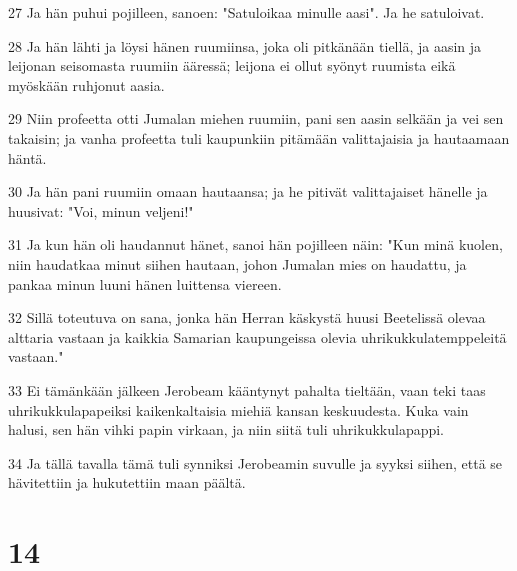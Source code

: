 \par 27 Ja hän puhui pojilleen, sanoen: "Satuloikaa minulle aasi". Ja he satuloivat.
\par 28 Ja hän lähti ja löysi hänen ruumiinsa, joka oli pitkänään tiellä, ja aasin ja leijonan seisomasta ruumiin ääressä; leijona ei ollut syönyt ruumista eikä myöskään ruhjonut aasia.
\par 29 Niin profeetta otti Jumalan miehen ruumiin, pani sen aasin selkään ja vei sen takaisin; ja vanha profeetta tuli kaupunkiin pitämään valittajaisia ja hautaamaan häntä.
\par 30 Ja hän pani ruumiin omaan hautaansa; ja he pitivät valittajaiset hänelle ja huusivat: "Voi, minun veljeni!"
\par 31 Ja kun hän oli haudannut hänet, sanoi hän pojilleen näin: "Kun minä kuolen, niin haudatkaa minut siihen hautaan, johon Jumalan mies on haudattu, ja pankaa minun luuni hänen luittensa viereen.
\par 32 Sillä toteutuva on sana, jonka hän Herran käskystä huusi Beetelissä olevaa alttaria vastaan ja kaikkia Samarian kaupungeissa olevia uhrikukkulatemppeleitä vastaan."
\par 33 Ei tämänkään jälkeen Jerobeam kääntynyt pahalta tieltään, vaan teki taas uhrikukkulapapeiksi kaikenkaltaisia miehiä kansan keskuudesta. Kuka vain halusi, sen hän vihki papin virkaan, ja niin siitä tuli uhrikukkulapappi.
\par 34 Ja tällä tavalla tämä tuli synniksi Jerobeamin suvulle ja syyksi siihen, että se hävitettiin ja hukutettiin maan päältä.

\chapter{14}

